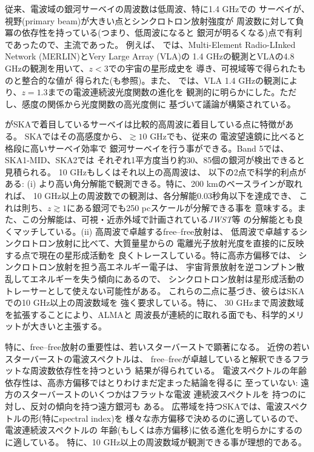 従来、電波域の銀河サーベイの周波数は低周波、特に1.4 GHzでの
サーベイが、視野(primary beam)が大きい点とシンクロトロン放射強度が
周波数に対して負冪の依存性を持っている(つまり、低周波になると
銀河が明るくなる)点で有利であったので、主流であった。
例えば、\citet{2008MNRAS.386.1695S}
では、Multi-Element Radio-LInked Network (MERLIN)とVery Large Array (VLA)の
1.4 GHzの観測とVLAの4.8 GHzの観測を用いて、$z<3$での宇宙の星形成史を
導き、可視域等で得られたものと整合的な値が
得られた(\citealt{2010ApJS..188..178M}も参照)。また、
\citet{2009ApJ...690..610S}
では、VLA 1.4 GHzの観測により、$z=1.3$までの電波連続波光度関数の進化を
観測的に明らかにした。ただし、感度の関係から光度関数の高光度側に
基づいて議論が構築されている。

\citet{murphy15}がSKAで着目しているサーベイは比較的高周波に着目している点に特徴がある。
SKAではその高感度から、$\gtrsim 10$ GHzでも、従来の
電波望遠鏡に比べると格段に高いサーベイ効率で
銀河サーベイを行う事ができる。Band 5では、SKA1-MID、SKA2では
それぞれ1平方度当り約30、85個の銀河が検出できると見積られる。
10 GHzもしくはそれ以上の高周波は、
以下の2点で科学的利点がある: (i)
より高い角分解能で観測できる。特に、200 kmのベースラインが取れれば、
10 GHz以上の周波数での観測は、各分解能0.03秒角以下を達成でき、
これは則ち、$z\gtrsim 1$にある銀河でも250 pcスケールが分解できる事を
意味する。また、この分解能は、可視・近赤外域で計画されている\textit{JWST}等
の分解能とも良くマッチしている。(ii) 高周波で卓越するfree--free放射は、
低周波で卓越するシンクロトロン放射に比べて、大質量星からの
電離光子放射光度を直接的に反映する点で現在の星形成活動を
良くトレースしている。特に高赤方偏移では、
シンクロトロン放射を担う高エネルギー電子は、
宇宙背景放射を逆コンプトン散乱してエネルギーを失う傾向にあるので、
シンクロトロン放射は星形成活動のトレーサーとして使えない可能性がある。
これらの二点に基づき、彼らはSKAでの10 GHz以上の周波数域を
強く要求している。特に、
30 GHzまで周波数域を拡張することにより、ALMAと
周波長が連続的に取れる面でも、科学的メリットが大きいと主張する。

特に、free--free放射の重要性は、若いスターバーストで顕著になる。
近傍の若いスターバーストの電波スペクトルは、
free--freeが卓越していると解釈できるフラットな周波数依存性を持つという
結果が得られている\citep{1993ApJ...410..626D,2003ApJ...593..733R,2005A&A...436..837H}。
電波スペクトルの年齢依存性は、高赤方偏移ではとりわけまだ定まった結論を得るに
至っていない: 遠方のスターバーストのいくつかはフラットな電波
連続波スペクトルを
持つ\citep{2005A&A...436..837H,2006A&A...460...67H,2011MNRAS.415.3473V}のに
対し、反対の傾向を持つ遠方銀河も
ある\citep{2011MNRAS.410.1155B,2014MNRAS.442..577T}。
広帯域を持つSKAでは、電波スペクトルの形(特にspectral index)を
様々な赤方偏移で決めるのに適しているので、電波連続波スペクトルの
年齢(もしくは赤方偏移)に依る進化を明らかにするのに適している。
特に、10 GHz以上の周波数域が観測できる事が理想的である。

